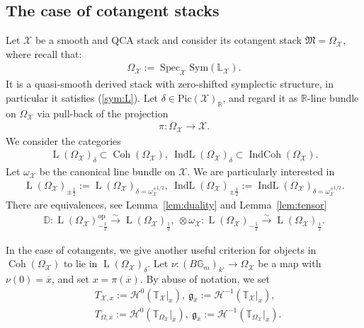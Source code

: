 \documentclass [11pt,oneside,a4paper,mathscr]{amsart}
\theoremstyle{definition}
\newcommand{\LL}{\operatorname{L}}
\newcommand{\X}{\mathcal{X}}
\newcommand{\bgm}{B\mathbb{G}_m}
\newcommand{\Coh}{\operatorname{Coh}}
\newcommand{\IndCoh}{\operatorname{IndCoh}}
\newcommand{\IndL}{\operatorname{IndL}}
\newcommand{\Spec}{\operatorname{Spec}}
\begin{document}
\subsection{The case of cotangent stacks}\label{subsec:cotan}
Let $\X$ be a smooth and QCA stack and consider 
its cotangent stack $\mathfrak{M}=\Omega_{\X}$, where recall that:
\begin{align*}
\Omega_{\X} :=
\Spec_{\X} \mathrm{Sym}(\mathbb{L}_{\X}). 
\end{align*}
It is a quasi-smooth derived stack with zero-shifted
symplectic structure, in particular it satisfies (\ref{sym:L}). 
Let $\delta \in \mathrm{Pic}(\X)_{\mathbb{R}}$, and 
regard it as $\mathbb{R}$-line bundle on $\Omega_{\X}$ 
via pull-back of the projection 
\begin{align*}
\pi \colon \Omega_{\X} \to \X.
\end{align*}
We consider 
the categories 
\begin{align*}
\LL(\Omega_{\X})_{\delta}
\subset \Coh(\Omega_{\X}), \ \IndL(\Omega_{\X})_{\delta}
\subset \IndCoh(\Omega_{\X}).     
\end{align*}
Let $\omega_{\X}$ be the canonical line bundle on 
$\X$. 
We are particularly interested in 
\begin{align}\label{L:half}
    \LL(\Omega_{\X})_{\pm \frac{1}{2}} :=
    \LL(\Omega_{\X})_{\delta=\omega_{\X}^{\pm 1/2}}, \ 
    \IndL(\Omega_{\X})_{\pm \frac{1}{2}}:=
    \IndL(\Omega_{\X})_{\delta=\omega_{\X}^{\pm 1/2}}.
\end{align}
There are equivalences, see Lemma~\ref{lem:duality} and Lemma~\ref{lem:tensor}
\begin{align}\label{equiv:Domega}
    \mathbb{D} \colon \LL(\Omega_{\X})^{\mathrm{op}}_{-\frac{1}{2}}
    \stackrel{\sim}{\to} \LL(\Omega_{\X})_{\frac{1}{2}}, \ 
    \otimes \omega_{\X} \colon 
 \LL(\Omega_{\X})_{-\frac{1}{2}}
    \stackrel{\sim}{\to} \LL(\Omega_{\X})_{\frac{1}{2}}.   
\end{align}

In the case of cotangents, we give another useful criterion for objects in 
$\Coh(\Omega_{\X})$ to lie in $\LL(\Omega_{\X})_{\delta}$.
Let $\nu \colon (\bgm)_{k'} \to \Omega_{\X}$ be a map with 
$\nu(0)=\overline{x}$, and set $x=\pi(\overline{x})$. 
By abuse of notation, we set 
\begin{align*}
    &T_{\X, x}:=\mathcal{H}^0(\mathbb{T}_{\X}|_{x}), \ 
    \mathfrak{g}_x :=\mathcal{H}^{-1}(\mathbb{T}_{\X}|_{x}), \\ 
    &T_{\Omega, \overline{x}}:=\mathcal{H}^0(\mathbb{T}_{\Omega_{\X}}|_{\overline{x}}), \ 
    \mathfrak{g}_{\overline{x}}:=\mathcal{H}^{-1}(\mathbb{T}_{\Omega_{\X}}|_{\overline{x}}). 
\end{align*}
\end{document}

